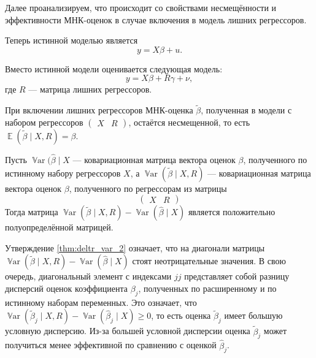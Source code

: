 \documentclass[12pt]{article}
\DeclareMathOperator{\Var}{\mathbb{V}ar}
\DeclareMathOperator{\E}{\mathbb{E}}
\newcommand{\hb}{\hat{\beta}}
\newcommand{\tb}{\tilde{\beta}}
\begin{document}
Далее проанализируем, что происходит со свойствами несмещённости и эффективности МНК-оценок в случае включения в модель лишних регрессоров.

Теперь истинной моделью является
\[
y = X\beta + u.
\]

Вместо истинной модели оценивается следующая модель:
\[
y = X\beta + R\gamma + \nu,
\]
где $R$ — матрица лишних регрессоров.

\begin{lemma}
При включении лишних регрессоров МНК-оценка $\tb$, полученная в модели с набором регрессоров 
$\begin{pmatrix} X & R\end{pmatrix}$, 
остаётся несмещенной, то есть $\E(\tb \mid X, R) = \beta$.
\end{lemma}

\begin{lemma}
\label{thm:deltr_var_2}
Пусть $\Var(\hb \mid X$ — ковариационная матрица вектора оценок $\beta$, полученного по истинному набору регрессоров $X$, а $\Var(\tb \mid X,R)$ — ковариационная матрица вектора оценок $\beta$, полученного по регрессорам  из матрицы 
\[
\begin{pmatrix} X & R\end{pmatrix}
\]
Тогда матрица $\Var(\tb \mid X, R) - \Var(\hb \mid X)$ является положительно полуопределённой матрицей.
\end{lemma}

Утверждение \ref{thm:deltr_var_2} означает, что на диагонали матрицы $\Var(\tb \mid X, R) - \Var(\hb \mid X)$ стоят неотрицательные значения. 
В свою очередь, диагональный элемент с индексами ${jj}$ представляет собой разницу дисперсий оценок коэффициента $\beta_j$, полученных по расширенному и по истинному наборам переменных. 
Это означает, что $\Var(\tb_j \mid X, R) - \Var(\hb_j \mid X) \geq 0$, то есть оценка $\tb_j$ имеет большую условную дисперсию. 
Из-за большей условной дисперсии оценка $\tb_j$ может получиться менее эффективной по сравнению с оценкой $\hb_j$.
\end{document}

